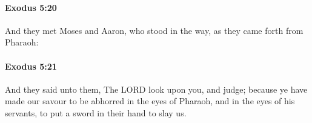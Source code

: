 		\paragraph{Exodus 5:20} %
			\label{EXODUS-5-20}

			And they met Moses and Aaron, who stood in the way, as they came forth from Pharaoh:


		\paragraph{Exodus 5:21} %
			\label{EXODUS-5-21}

			And they said unto them, The LORD look upon you, and judge; because ye have made our savour to be abhorred in the eyes of Pharaoh, and in the eyes of his servants, to put a sword in their hand to slay us.



